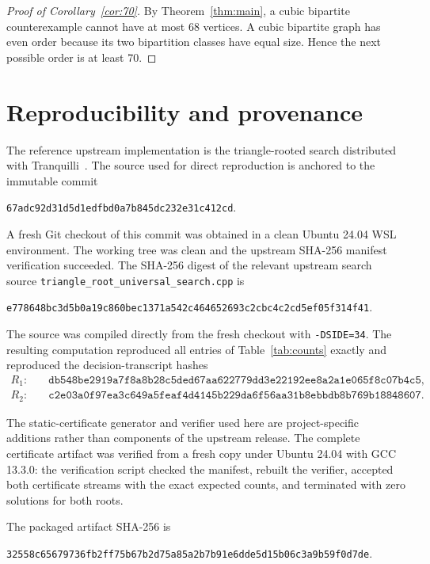 \documentclass[11pt]{article}
\theoremstyle{remark}
\begin{document}
\begin{proof}[Proof of Corollary~\ref{cor:70}]
By Theorem~\ref{thm:main}, a cubic bipartite counterexample cannot have at most 68 vertices.  A cubic bipartite graph has even order because its two bipartition classes have equal size.  Hence the next possible order is at least 70.
\end{proof}

\section{Reproducibility and provenance}\label{sec:repro}

The reference upstream implementation is the triangle-rooted search distributed with Tranquilli~\cite{tranquilli2026}.  The source used for direct reproduction is anchored to the immutable commit
\begin{center}
\texttt{67adc92d31d5d1edfbd0a7b845dc232e31c412cd}.
\end{center}
A fresh Git checkout of this commit was obtained in a clean Ubuntu 24.04 WSL environment.  The working tree was clean and the upstream SHA-256 manifest verification succeeded.  The SHA-256 digest of the relevant upstream search source \texttt{triangle\_root\_universal\_search.cpp} is
\begin{center}
\texttt{e778648bc3d5b0a19c860bec1371a542c464652693c2cbc4c2cd5ef05f314f41}.
\end{center}
The source was compiled directly from the fresh checkout with \texttt{-DSIDE=34}.  The resulting computation reproduced all entries of Table~\ref{tab:counts} exactly and reproduced the decision-transcript hashes
\begin{align*}
R_1:&\quad \texttt{db548be2919a7f8a8b28c5ded67aa622779dd3e22192ee8a2a1e065f8c07b4c5},\\
R_2:&\quad \texttt{c2e03a0f97ea3c649a5feaf4d4145b229da6f56aa31b8ebbdb8b769b18848607}.
\end{align*}

The static-certificate generator and verifier used here are project-specific additions rather than components of the upstream release.  The complete certificate artifact was verified from a fresh copy under Ubuntu 24.04 with GCC 13.3.0: the verification script checked the manifest, rebuilt the verifier, accepted both certificate streams with the exact expected counts, and terminated with zero solutions for both roots.

The packaged artifact SHA-256 is
\begin{center}
\texttt{32558c65679736fb2ff75b67b2d75a85a2b7b91e6dde5d15b06c3a9b59f0d7de}.
\end{center}
\end{document}
